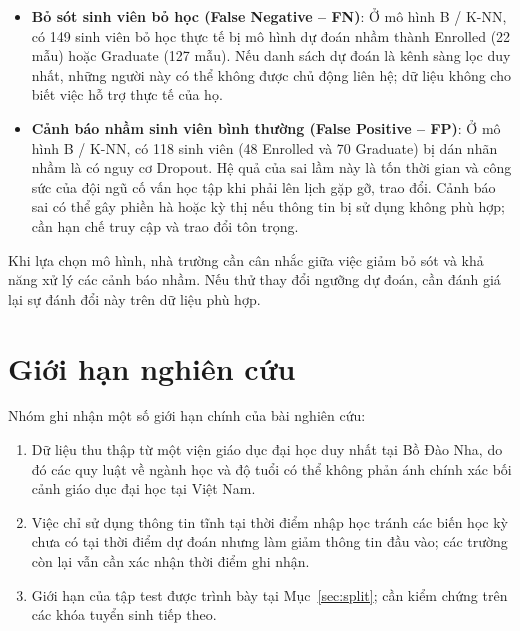 \begin{itemize}
    \item \textbf{Bỏ sót sinh viên bỏ học (False Negative -- FN)}:
    Ở mô hình B / K-NN, có 149 sinh viên bỏ học thực tế bị mô hình dự đoán nhầm thành Enrolled (22 mẫu) hoặc Graduate (127 mẫu). Nếu danh sách dự đoán là kênh sàng lọc duy nhất, những người này có thể không được chủ động liên hệ; dữ liệu không cho biết việc hỗ trợ thực tế của họ.
    \item \textbf{Cảnh báo nhầm sinh viên bình thường (False Positive -- FP)}:
    Ở mô hình B / K-NN, có 118 sinh viên (48 Enrolled và 70 Graduate) bị dán nhãn nhầm là có nguy cơ Dropout. Hệ quả của sai lầm này là tốn thời gian và công sức của đội ngũ cố vấn học tập khi phải lên lịch gặp gỡ, trao đổi. Cảnh báo sai có thể gây phiền hà hoặc kỳ thị nếu thông tin bị sử dụng không phù hợp; cần hạn chế truy cập và trao đổi tôn trọng.
\end{itemize}
Khi lựa chọn mô hình, nhà trường cần cân nhắc giữa việc giảm bỏ sót và khả năng xử lý các cảnh báo nhầm. Nếu thử thay đổi ngưỡng dự đoán, cần đánh giá lại sự đánh đổi này trên dữ liệu phù hợp.

\section{Giới hạn nghiên cứu}
Nhóm ghi nhận một số giới hạn chính của bài nghiên cứu:
\begin{enumerate}
    \item Dữ liệu thu thập từ một viện giáo dục đại học duy nhất tại Bồ Đào Nha, do đó các quy luật về ngành học và độ tuổi có thể không phản ánh chính xác bối cảnh giáo dục đại học tại Việt Nam.
    \item Việc chỉ sử dụng thông tin tĩnh tại thời điểm nhập học tránh các biến học kỳ chưa có tại thời điểm dự đoán nhưng làm giảm thông tin đầu vào; các trường còn lại vẫn cần xác nhận thời điểm ghi nhận.
    \item Giới hạn của tập test được trình bày tại Mục~\ref{sec:split}; cần kiểm chứng trên các khóa tuyển sinh tiếp theo.
\end{enumerate}
